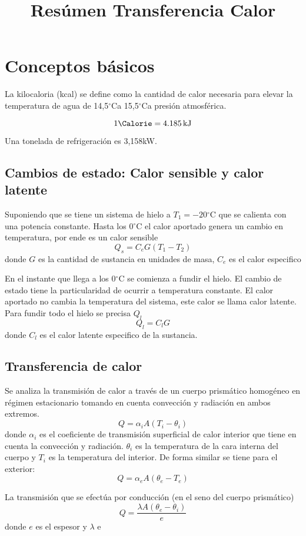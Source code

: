 \documentclass[titlepage]{article}
\title{Resúmen Transferencia Calor}
\newcommand{\celsius}{\ensuremath{^\circ\textrm{C}}}
\newcommand{\latente}{{l}}
\newcommand{\Qs}{Q_s}
\newcommand{\Ql}{Q_\latente}
\newcommand{\Ce}{C_e}
\newcommand{\Cl}{C_\latente}
\newcommand{\masa}{G}
\newcommand{\alfai}{\alpha_i}
\newcommand{\alfae}{\alpha_e}
\begin{document}
	\section{Conceptos básicos}
	La kilocaloria (kcal) se define como la cantidad de calor necesaria para elevar la temperatura de agua de 14,5\celsius a 15,5\celsius a presión atmosférica. 
	
	\[1 \si{\Calorie} =\SI{4,185}{\kilo\joule}\]
	
	Una tonelada de refrigeración es 3,158kW.
	\subsection{Cambios de estado: Calor sensible y calor latente}
	Suponiendo que se tiene un sistema de hielo a $T_1=-20\celsius$ que se calienta con una potencia constante. Hasta los $0\celsius$ el calor aportado genera un cambio en temperatura, por ende es un calor sensible
	\[\Qs = \Ce \masa (T_1 - T_2)\]
	donde $\masa$ es la cantidad de sustancia en unidades de masa, $\Ce$ es el calor especifico
	 
	En el instante que llega a los $0\celsius$ se comienza a fundir el hielo. El cambio de estado tiene la particularidad de ocurrir a temperatura constante. El calor aportado no cambia la temperatura del sistema, este calor se llama calor latente. Para fundir todo el hielo se precisa $\Ql$
	\[ \Ql = \Cl \masa
	\]
	donde $\Cl$ es el calor latente especifico de la sustancia.
	
	\subsection{Transferencia de calor}
	Se analiza la transmisión de calor a través de un cuerpo prismático homogéneo en régimen estacionario tomando en cuenta convección y radiación en ambos extremos. 
	\[
	Q = \alfai A (T_i - \theta_i)
	\]
	donde $\alfai $ es el coeficiente de transmisión superficial de calor interior que tiene en cuenta la convección y radiación. $\theta_i$ es la temperatura de la cara interna del cuerpo y $T_i$ es la temperatura del interior. De forma similar se tiene para el exterior:
	\[
	Q = \alfae A ( \theta_e -T_e)
	\]
	
	La transmisión que se efectúa por conducción (en el seno del cuerpo prismático)
	\[
	Q = \frac{\lambda A(\theta_e-\theta_i)}{e}
	\]
	donde $e$ es el espesor y $\lambda $ e
	
	
\end{document}
